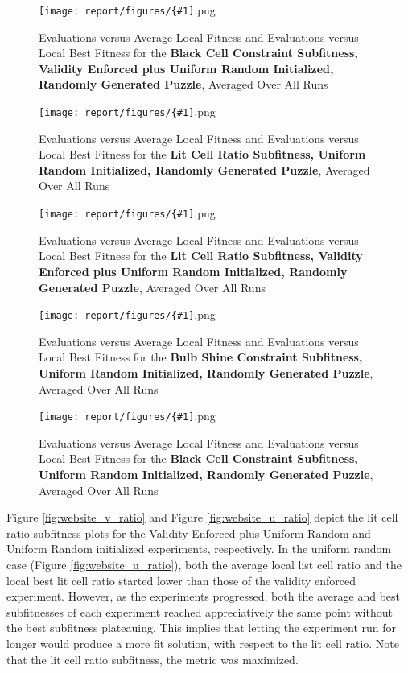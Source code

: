 \documentclass[11pt]{article}
\newcommand{\fitnessplotcaption}[1]{\caption{Evaluations versus Average Local Fitness and Evaluations versus 
    Local Best Fitness for the \textbf{{#1}}, Averaged Over All Runs}}
\newcommand{\addgraphic}[1]{\centerline{\texttt{[image: report/figures/\{\#1]}.png}}}
\begin{document}
\begin{figure}[H]
    \addgraphic{random_gen_black_cell_constr__graph}
    \fitnessplotcaption{Black Cell Constraint Subfitness, Validity Enforced plus Uniform Random Initialized, Randomly Generated Puzzle}
    \label{fig:random_gen_v_black}
\end{figure}

\begin{figure}[H]
    \addgraphic{random_gen_uniform_random_init_lit_cell_ratio__graph}
    \fitnessplotcaption{Lit Cell Ratio Subfitness, Uniform Random Initialized, Randomly Generated Puzzle}
    \label{fig:random_gen_u_ratio}
\end{figure}

\begin{figure}[H]
    \addgraphic{random_gen_lit_cell_ratio__graph}
    \fitnessplotcaption{Lit Cell Ratio Subfitness, Validity Enforced plus Uniform Random Initialized, Randomly Generated Puzzle}
    \label{fig:random_gen_v_ratio}
\end{figure}

\begin{figure}[H]
    \addgraphic{random_gen_uniform_random_init_bulb_shine_constr__graph}
    \fitnessplotcaption{Bulb Shine Constraint Subfitness, Uniform Random Initialized, Randomly Generated Puzzle}
    \label{fig:random_gen_u_shine}
\end{figure}

\begin{figure}[H]
    \addgraphic{random_gen_uniform_random_init_black_cell_constr__graph}
    \fitnessplotcaption{Black Cell Constraint Subfitness, Uniform Random Initialized, Randomly Generated Puzzle}
    \label{fig:random_gen_u_black}
\end{figure}


Figure \ref{fig:website_v_ratio} and Figure \ref{fig:website_u_ratio} depict the lit cell ratio subfitness
plots for the Validity Enforced plus Uniform Random and Uniform Random initialized experiments,
respectively. In the uniform random case (Figure \ref{fig:website_u_ratio}), both the average local
list cell ratio and the local best lit cell ratio started lower than those of the validity enforced 
experiment. However, as the experiments progressed, both the average and best subfitnesses of each
experiment reached appreciatively the same point without the best subfitness plateauing. This implies
that letting the experiment run for longer would produce a more fit solution, with respect to
the lit cell ratio. Note that the lit cell ratio subfitness, the metric was maximized.
\end{document}
